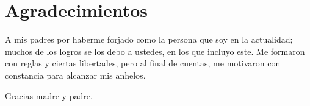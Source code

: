 \chapter*{Agradecimientos}
A mis padres por haberme forjado como la persona que soy en la actualidad; muchos de los logros se los debo a ustedes, en los que incluyo este. Me formaron con reglas y ciertas libertades, pero al final de cuentas, me motivaron con constancia para alcanzar mis anhelos.
\\
\begin{flushright}
	Gracias madre y padre.
\end{flushright}
